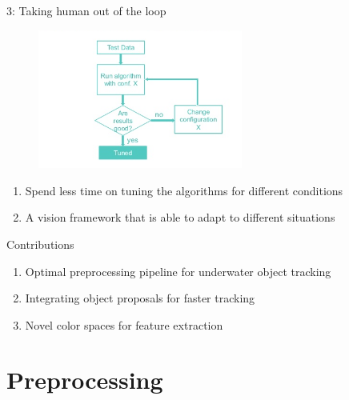 \documentclass[13pt]{beamer}
\begin{document}
\begin{frame}{3: Taking human out of the loop}

  \begin{figure}[ht]
      \centering
      \includegraphics[width=0.6\textwidth, height=0.3\textwidth]{figs/tuning.png}
  \end{figure}

  \begin{enumerate}
    \item Spend less time on tuning the algorithms for different conditions
    \item A vision framework that is able to adapt to different situations
  \end{enumerate}

\end{frame}

\begin{frame}[standout]{Contributions}
  \begin{enumerate}
    \item Optimal preprocessing pipeline for underwater object tracking
    \item Integrating object proposals for faster tracking
    \item Novel color spaces for feature extraction
  \end{enumerate}
\end{frame}

\section{Preprocessing}
\end{document}
